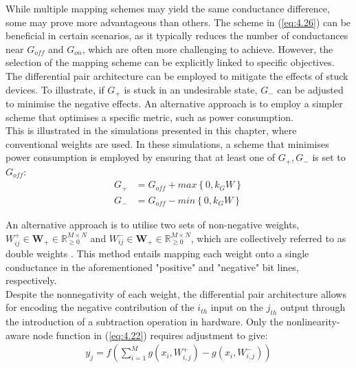 \noindent While multiple mapping schemes may yield the same conductance difference, some may prove more advantageous than others. The scheme in (\ref{eq:4.26}) can be beneficial in certain scenarios, as it typically reduces the number of conductances near $G_{off}$ and $G_{on}$, which are often more challenging to achieve. However, the selection of the mapping scheme can be explicitly linked to specific objectives.\\

\noindent The differential pair architecture can be employed to mitigate the effects of stuck devices. To illustrate, if $G_+$ is stuck in an undesirable state, $G_-$ can be adjusted to minimise the negative effects. An alternative approach is to employ a simpler scheme that optimises a specific metric, such as power consumption. \\

\noindent This is illustrated in the simulations presented in this chapter, where conventional weights are used. In these simulations, a scheme that minimises power consumption is employed by ensuring that at least one of ${G_+, G_-}$ is set to $G_{off}$:
\begin{align}
G_+ &= G_{off} + max\left\{ 0, k_GW \right\} \label{eq:4.28} \\
G_- &= G_{off} - min\left\{ 0, k_GW \right\} \label{eq:4.29}
\end{align}

\noindent An alternative approach is to utilise two sets of non-negative weights, $W^+_{ij} \in \mathbf{W}_+ \in \mathbb{R}^{M \times N}_{\ge 0}$ and $W^-_{ij} \in \mathbf{W}_+ \in \mathbb{R}^{M \times N}_{\ge 0}$, which are collectively referred to as double weights \cite{kendall2020training}. This method entails mapping each weight onto a single conductance in the aforementioned "positive" and "negative" bit lines, respectively. \\

\noindent Despite the nonnegativity of each weight, the differential pair architecture allows for encoding the negative contribution of the $i_{th}$ input on the $j_{th}$ output through the introduction of a subtraction operation in hardware. Only the nonlinearity-aware node function in (\ref{eq:4.22}) requires adjustment to give:
\begin{align}
y_j = f\left( \sum_{i=1}^{M} g\left( x_i,W_{i,j}^+ \right) - g\left( x_i,W_{i,j}^- \right) \right) \label{eq:4.30}
\end{align}

